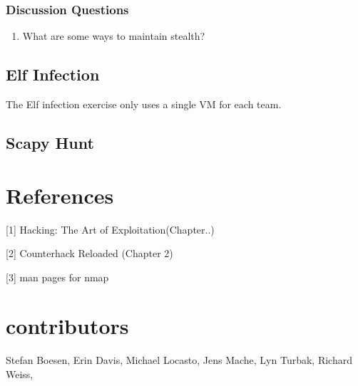 \documentclass[11pt]{report}
\begin{document}
\subsubsection{Discussion Questions}
\begin{enumerate}
  \item What are some ways to maintain stealth?
\end{enumerate}

\subsection{Elf Infection}
The Elf infection exercise only uses a single VM for each team.  


\subsection{Scapy Hunt}





\section{References}
[1] Hacking: The Art of Exploitation(Chapter..)

[2] Counterhack Reloaded (Chapter 2)

[3] man pages for nmap


\section*{contributors}
Stefan Boesen, Erin Davis, Michael Locasto, Jens Mache,  Lyn Turbak, Richard Weiss, 

%
%
\end{document}

